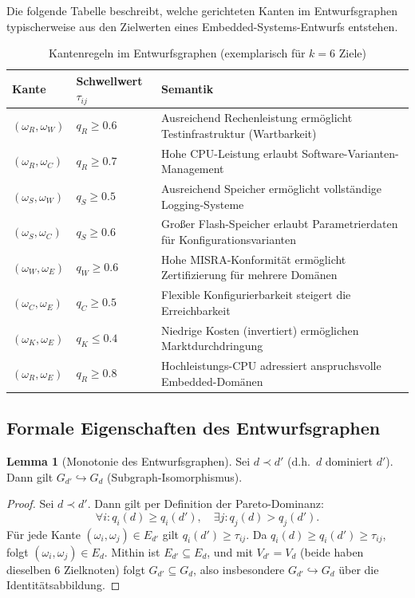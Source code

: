 ﻿\documentclass[a4paper,12pt]{article}
\theoremstyle{definition}
\newtheorem{lemma}{Lemma}
\begin{document}
Die folgende Tabelle beschreibt, welche gerichteten Kanten im Entwurfsgraphen
typischerweise aus den Zielwerten eines Embedded-Systems-Entwurfs entstehen.

\begin{table}[H]
\centering
\small
\renewcommand{\arraystretch}{1.4}
\begin{tabular}{llp{6.5cm}}
\toprule
\textbf{Kante} & \textbf{Schwellwert $\tau_{ij}$} & \textbf{Semantik} \\
\midrule
$(\omega_R, \omega_W)$ & $q_R \geq 0.6$ &
    Ausreichend Rechenleistung erm\"{o}glicht Testinfrastruktur (Wartbarkeit)\\
$(\omega_R, \omega_C)$ & $q_R \geq 0.7$ &
    Hohe CPU-Leistung erlaubt Software-Varianten-Management\\
$(\omega_S, \omega_W)$ & $q_S \geq 0.5$ &
    Ausreichend Speicher erm\"{o}glicht vollst\"{a}ndige Logging-Systeme\\
$(\omega_S, \omega_C)$ & $q_S \geq 0.6$ &
    Gro{\ss}er Flash-Speicher erlaubt Parametrierdaten f\"{u}r Konfigurationsvarianten\\
$(\omega_W, \omega_E)$ & $q_W \geq 0.6$ &
    Hohe MISRA-Konformit\"{a}t erm\"{o}glicht Zertifizierung f\"{u}r mehrere Dom\"{a}nen\\
$(\omega_C, \omega_E)$ & $q_C \geq 0.5$ &
    Flexible Konfigurierbarkeit steigert die Erreichbarkeit\\
$(\omega_K, \omega_E)$ & $q_K \leq 0.4$ &
    Niedrige Kosten (invertiert) erm\"{o}glichen Marktdurchdringung\\
$(\omega_R, \omega_E)$ & $q_R \geq 0.8$ &
    Hochleistungs-CPU adressiert anspruchsvolle Embedded-Dom\"{a}nen\\
\bottomrule
\end{tabular}
\caption{Kantenregeln im Entwurfsgraphen (exemplarisch f\"{u}r $k=6$ Ziele)}
\label{tab:edges}
\end{table}

\subsection{Formale Eigenschaften des Entwurfsgraphen}

\begin{lemma}[Monotonie des Entwurfsgraphen]\label{lem:monotonie}
    Sei $d \prec d'$ (d.h.\ $d$ dominiert $d'$). Dann gilt
    $G_{d'} \hookrightarrow G_d$ (Subgraph-Isomorphismus).
\end{lemma}

\begin{proof}
    Sei $d \prec d'$. Dann gilt per Definition der Pareto-Dominanz:
    \[
        \forall i: q_i(d) \geq q_i(d'), \quad \exists j: q_j(d) > q_j(d').
    \]
    F\"{u}r jede Kante $(\omega_i, \omega_j) \in E_{d'}$ gilt
    $q_i(d') \geq \tau_{ij}$. Da $q_i(d) \geq q_i(d') \geq \tau_{ij}$,
    folgt $(\omega_i, \omega_j) \in E_d$.
    Mithin ist $E_{d'} \subseteq E_d$, und mit $V_{d'} = V_d$ (beide haben
    dieselben 6 Zielknoten) folgt $G_{d'} \subseteq G_d$, also insbesondere
    $G_{d'} \hookrightarrow G_d$ \"{u}ber die Identit\"{a}tsabbildung.
\end{proof}
\end{document}
